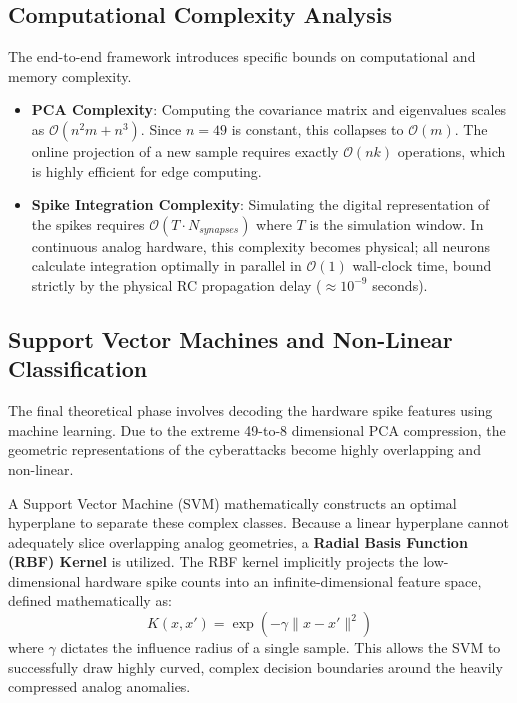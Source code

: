 \documentclass{ieeeaccess}
\begin{document}
\subsection{Computational Complexity Analysis}
The end-to-end framework introduces specific bounds on computational and memory complexity. 
\begin{itemize}
\item \textbf{PCA Complexity}: Computing the covariance matrix and eigenvalues scales as $\mathcal{O}(n^2m + n^3)$. Since $n=49$ is constant, this collapses to $\mathcal{O}(m)$. The online projection of a new sample requires exactly $\mathcal{O}(nk)$ operations, which is highly efficient for edge computing.
\item \textbf{Spike Integration Complexity}: Simulating the digital representation of the spikes requires $\mathcal{O}(T \cdot N_{synapses})$ where $T$ is the simulation window. In continuous analog hardware, this complexity becomes physical; all neurons calculate integration optimally in parallel in $\mathcal{O}(1)$ wall-clock time, bound strictly by the physical RC propagation delay ($\approx 10^{-9}$ seconds).
\end{itemize}

\subsection{Support Vector Machines and Non-Linear Classification}

The final theoretical phase involves decoding the hardware spike features using machine learning. Due to the extreme 49-to-8 dimensional PCA compression, the geometric representations of the cyberattacks become highly overlapping and non-linear. 

A Support Vector Machine (SVM) mathematically constructs an optimal hyperplane to separate these complex classes. Because a linear hyperplane cannot adequately slice overlapping analog geometries, a \textbf{Radial Basis Function (RBF) Kernel} is utilized. The RBF kernel implicitly projects the low-dimensional hardware spike counts into an infinite-dimensional feature space, defined mathematically as:
\begin{equation}
K(x, x') = \exp\left( -\gamma \|x - x'\|^2 \right)
\end{equation}
where $\gamma$ dictates the influence radius of a single sample. This allows the SVM to successfully draw highly curved, complex decision boundaries around the heavily compressed analog anomalies.
\end{document}
